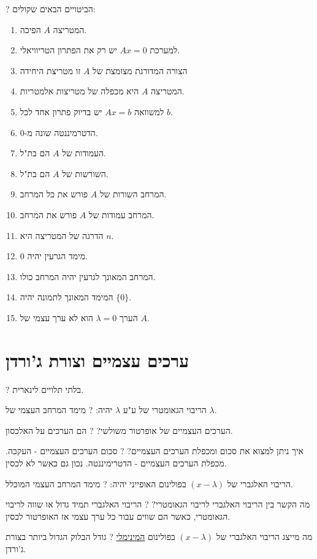 \documentclass{tstextbook}
\begin{document}
?
הביטויים הבאים שקולים:

\begin{enumerate}
  \item המטריצה \(A\) הפיכה. 


  \item למערכת \(Ax=0\) יש רק את הפתרון הטריוויאלי. 


  \item הצורה המדורגת מצומצת של \(A\) זו מטריצת היחידה 


  \item המטריצה \(A\) היא מכפלה של מטריצות אלמטריות. 


  \item למשוואה \(Ax=b\) יש בדיוק פתרון אחד לכל \(b\). 


  \item הדטרמיננטה שונה מ-0. 


  \item העמודות של \(A\) הם בת"ל. 


  \item השורשות של \(A\) הם בת"ל. 


  \item המרחב השורות של \(A\) פורש את כל המרחב. 


  \item המרחב עמודות של \(A\) פורש את המרחב. 


  \item הדרגה של המטריצה היא \(n\). 


  \item מימד הגרעין יהיה 0. 


  \item המרחב המאונך לגרעין יהיה המרחב כולו. 


  \item המימד המאונך לתמונה יהיה \(\{ 0 \}\). 


  \item הערך \(\lambda=0\) הוא לא ערך עצמי של \(A\). 


\end{enumerate}
\section{ערכים עצמיים וצורת ג'ורדן}

?
בלתי תלויים לינארית.

הריבוי הגאומטרי של ע"ע \(\lambda\) יהיה:
?
מימד המרחב העצמי של \(\lambda\).

הערכים העצמיים של אופרטור משולשי?
?
הם הערכים על האלכסון.

איך ניתן למצוא את סכום ומכפלת הערכים העצמיים?
?
סכום הערכים העצמיים - העקבה. מכפלת הערכים העצמיים - הדטרימיננטה. נכון גם כאשר לא לכסין.

הריבוי האלגברי של \(\left( x-\lambda \right)\) בפולינום האופייני יהיה:
?
מימד המרחב העצמי המוכלל.

מה הקשר בין הריבוי האלגברי לריבוי הגאומטרי?
?
הריבוי האלגברי תמיד גדול או שווה לריבוי הגאומטרי, כאשר הם שווים עבור כל ערך עצמי אז האופרטור לכסין.

מה מייצג הריבוי האלגברי של \(\left( x-\lambda \right)\) בפולינום \underline{המינימלי}
?
גודל הבלוק הגדול ביותר בצורת ג'ורדן.
\end{document}
